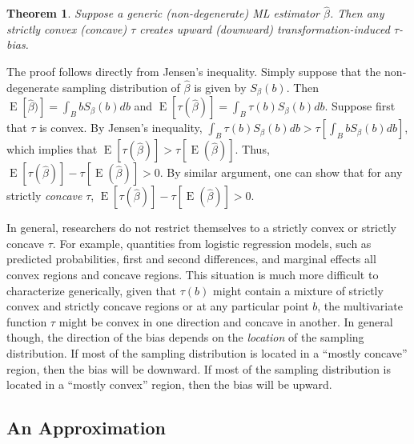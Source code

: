\documentclass[12pt]{article}
\newtheorem{theorem}{Theorem}
\newenvironment{proof}[1][Proof]{\begin{trivlist}
\item[\hskip \labelsep {\bfseries #1}]}{\end{trivlist}}
\DeclareMathOperator*{\E}{\text{E}}
\begin{document}
\begin{theorem}
Suppose a generic (non-degenerate) ML estimator $\hat{\beta}$. Then any strictly convex (concave) $\tau$ creates upward (downward) transformation-induced $\tau$-bias.
\end{theorem} 
\begin{proof}
The proof follows directly from Jensen's inequality. Simply suppose that the non-degenerate sampling distribution of $\hat{\beta}$ is given by $S_\beta(b)$. Then $\E[\hat{\beta})] = \int_{B}bS_\beta(b)db$ and $\E[\tau(\hat{\beta})]  = \int_{B}\tau(b)S_\beta(b)db$. Suppose first that $\tau$ is convex. By Jensen's inequality, $\int_{B}\tau(b)S_\beta(b)db > \tau \left[ \int_{B}bS_\beta(b)db \right]$, which implies that $\E[\tau(\hat{\beta})] > \tau[\E(\hat{\beta})]$. Thus, $\E[\tau(\hat{\beta})] - \tau[\E(\hat{\beta})] > 0$. By similar argument, one can show that for any strictly \textit{concave} $\tau$, $\E[\tau(\hat{\beta})] - \tau[\E(\hat{\beta})] > 0$.
\end{proof}

In general, researchers do not restrict themselves to a strictly convex or strictly concave $\tau$. For example, quantities from logistic regression models, such as predicted probabilities, first and second differences, and marginal effects all convex regions and concave regions. This situation is much more difficult to characterize generically, given that $\tau(b)$ might contain a mixture of strictly convex and strictly concave regions or at any particular point $b$, the multivariate function $\tau$ might be convex in one direction and concave in another. In general though, the direction of the bias depends on the \textit{location} of the sampling distribution. If most of the sampling distribution is located in a ``mostly concave'' region, then the bias will be downward. If most of the sampling distribution is located in a ``mostly convex'' region, then the bias will be upward. 

\subsection*{An Approximation}
\end{document}
